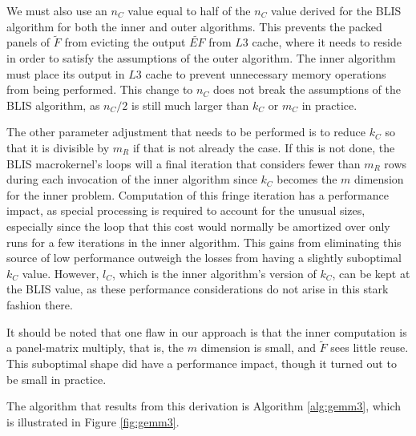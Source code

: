 \documentclass[12pt]{article}
\begin{document}
We must also use an $n_C$ value equal to half of the $n_C$ value derived for the BLIS algorithm for both the inner and outer algorithms.
This prevents the packed panels of $\widetilde{F}$ from evicting the output $\widetilde{EF}$ from $L3$ cache, where it needs to reside in order to satisfy the assumptions of the outer algorithm.
The inner algorithm must place its output in $L3$ cache to prevent unnecessary memory operations from being performed.
This change to $n_C$ does not  break the assumptions of the BLIS algorithm, as $n_C/2$ is still much larger than $k_C$ or $m_C$ in practice.

The other parameter adjustment that needs to be performed is to reduce $k_C$ so that it is divisible by $m_R$ if that is not already the case.
If this is not done, the BLIS macrokernel's loops will a final iteration that considers fewer than $m_R$ rows during each invocation of the inner algorithm since $k_C$ becomes the $m$ dimension for the inner problem.
Computation of this fringe iteration has a performance impact, as special processing is required to account for the unusual sizes, especially since the loop that this cost would normally be amortized over only runs for a few iterations in the inner algorithm.
This gains from eliminating this source of low performance outweigh the losses from having a slightly suboptimal $k_C$ value.
However, $l_C$, which is the inner algorithm's version of $k_C$, can be kept at the BLIS value, as these performance considerations do not arise in this stark fashion there.

It should be noted that one flaw in our approach is that the inner computation is a panel-matrix multiply, that is, the $m$ dimension is small, and $\widetilde{F}$ sees little reuse.
This suboptimal shape did have a performance impact, though it turned out to be small in practice.

The algorithm that results from this derivation is Algorithm \ref{alg:gemm3}, which is illustrated in Figure \ref{fig:gemm3}.
\end{document}
